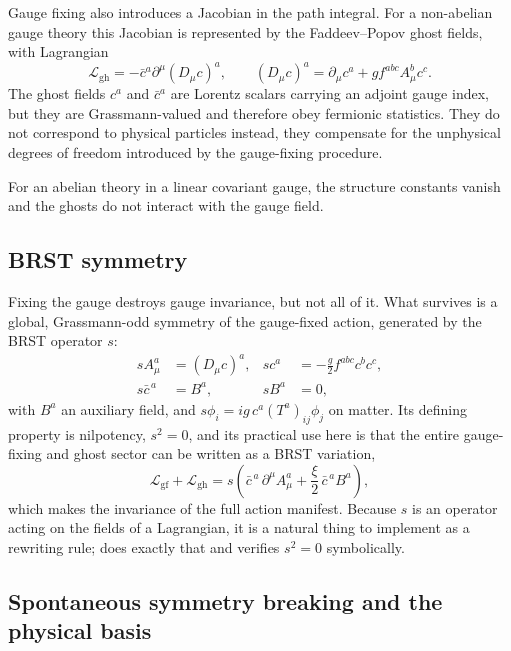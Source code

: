 Gauge fixing also introduces a Jacobian in the path integral. For a non-abelian gauge theory this Jacobian is represented by the Faddeev--Popov ghost fields, with Lagrangian
\begin{equation}
    \mathcal{L}_{\mathrm{gh}}
    =
    -\bar c^{a}\partial^\mu(D_\mu c)^a ,
    \qquad
    (D_\mu c)^a =
    \partial_\mu c^a
    + g f^{abc}A_\mu^b c^c .
\label{eq:theory-ghost}
\end{equation}
The ghost fields $c^a$ and $\bar c^{a}$ are Lorentz scalars carrying an
adjoint gauge index, but they are Grassmann-valued and therefore obey
fermionic statistics. They do not correspond to physical particles instead,
they compensate for the unphysical degrees of freedom introduced by the
gauge-fixing procedure.

For an abelian theory in a linear covariant gauge, the structure constants
vanish and the ghosts do not interact with the gauge field. 


\subsection{BRST symmetry}
\label{sec:theory-brst}

Fixing the gauge destroys gauge invariance, but not all of it. What survives
is a global, Grassmann-odd symmetry of the gauge-fixed
action, generated by the BRST operator $s$:
\begin{align}
    s A^a_\mu &= (D_\mu c)^a , &
    s c^a     &= -\tfrac{g}{2} f^{abc} c^b c^c , \\
    s \bar c^{\,a} &= B^a , &
    s B^a     &= 0 ,
\end{align}
with $B^a$ an auxiliary field, and $s\phi_i = i g\, c^a (T^a)_{ij}\phi_j$ on
matter. Its defining property is nilpotency, $s^2 = 0$, and its practical use
here is that the entire gauge-fixing and ghost sector can be written as a
BRST variation,
\begin{equation}
    \mathcal{L}_{\mathrm{gf}} + \mathcal{L}_{\mathrm{gh}}
    = s\!\left( \bar c^{\,a}\, \partial^\mu A^a_\mu
                + \frac{\xi}{2}\, \bar c^{\,a} B^a \right) ,
\end{equation}
which makes the invariance of the full action manifest. Because $s$ is an
operator acting on the fields of a Lagrangian, it is a natural thing to
implement as a rewriting rule;  does exactly that and
verifies $s^2=0$ symbolically.

\subsection{Spontaneous symmetry breaking and the physical basis}
\label{sec:theory-ssb}

